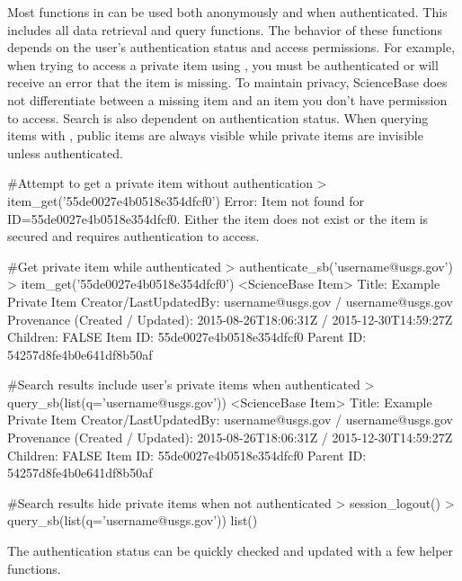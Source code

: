 Most functions in  can be used both anonymously and when
authenticated. This includes all data retrieval and query functions. The
behavior of these functions depends on the user's authentication status and
access permissions. For example, when trying to access a private item using
, you must be authenticated or will receive an error that the
item is missing. To maintain privacy, ScienceBase does not differentiate between
a missing item and an item you don't have permission to access. Search is also
dependent on authentication status. When querying items with ,
public items are always visible while private items are invisible unless
authenticated.

\begin{example}
#Attempt to get a private item without authentication
> item_get('55de0027e4b0518e354dfcf0')
 Error: Item not found for ID=55de0027e4b0518e354dfcf0. Either the
 item does not exist or the item is secured and requires authentication to access.

#Get private item while authenticated
> authenticate_sb('username@usgs.gov')
> item_get('55de0027e4b0518e354dfcf0')
 <ScienceBase Item>
  Title: Example Private Item
  Creator/LastUpdatedBy:     username@usgs.gov / username@usgs.gov
  Provenance (Created / Updated):  2015-08-26T18:06:31Z / 2015-12-30T14:59:27Z
  Children: FALSE
  Item ID: 55de0027e4b0518e354dfcf0
  Parent ID: 54257d8fe4b0e641df8b50af

#Search results include user's private items when authenticated
> query_sb(list(q='username@usgs.gov'))
 <ScienceBase Item>
  Title: Example Private Item
  Creator/LastUpdatedBy:     username@usgs.gov / username@usgs.gov
  Provenance (Created / Updated):  2015-08-26T18:06:31Z / 2015-12-30T14:59:27Z
  Children: FALSE
  Item ID: 55de0027e4b0518e354dfcf0
  Parent ID: 54257d8fe4b0e641df8b50af

#Search results hide private items when not authenticated
> session_logout()
> query_sb(list(q='username@usgs.gov'))
list()
\end{example}

The authentication status can be quickly checked and updated 
with a few helper functions.



